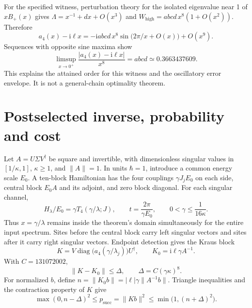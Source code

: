 \documentclass[11pt,a4paper]{article}
\newcommand{\ii}{\mathrm{i}}
\newcommand{\norm}[1]{\lVert #1\rVert}
\numberwithin{equation}{section}
\begin{document}
For the specified witness, perturbation theory for the isolated eigenvalue
near 1 of $xB_+(x)$ gives $\Lambda=x^{-1}+dx+O(x^3)$ and
$W_{\mathrm{high}}=abcd\,x^8(1+O(x^2))$. Therefore
\begin{equation}
 a_4(x)-\ii\ell x
 =-\ii abcd\,x^8\sin\bigl(2\pi/x+O(x)\bigr)+O(x^9).
 \label{eq:asymptotic}
\end{equation}
Sequences with opposite sine maxima show
\begin{equation}
 \limsup_{x\to0^+}\frac{|a_4(x)-\ii\ell x|}{x^8}
 =abcd\simeq0.3663437609.
\end{equation}
This explains the attained order for this witness and the oscillatory
error envelope. It is not a general-chain optimality theorem.

\section{Postselected inverse, probability and cost}
Let $A=U\Sigma V^\dagger$ be square and invertible, with dimensionless
singular values in $[1/\kappa,1]$, $\kappa\ge1$, and $\norm{A}=1$.
In units $\hbar=1$, introduce a common energy scale $E_0$. A ten-block
Hamiltonian has the four couplings $\gamma J_j E_0$ on each side,
central block $E_0A$ and its adjoint, and zero block diagonal.
For each singular channel,
\begin{equation}
 H_\lambda/E_0=\gamma T_4(\gamma/\lambda;J),\qquad
 t=\frac{2\pi}{\gamma E_0},\qquad
 0<\gamma\le\frac{1}{16\kappa}.
 \label{eq:units}
\end{equation}
Thus $x=\gamma/\lambda$ remains inside the theorem's domain
simultaneously for the entire input spectrum. Sites before the central
block carry left singular vectors and sites after it carry right singular
vectors. Endpoint detection gives the Kraus block
\begin{equation}
 K=V\operatorname{diag}\bigl(a_4(\gamma/\lambda_j)\bigr)U^\dagger,
 \qquad K_0=\ii\ell\gamma A^{-1}.
\end{equation}
With $C=131072002$,
\begin{equation}
 \norm{K-K_0}\le\Delta,\qquad
 \Delta=C(\gamma\kappa)^8.
 \label{eq:krauserror}
\end{equation}
For normalized $b$, define $n=\norm{K_0b}=|\ell|\gamma\norm{A^{-1}b}$.
Triangle inequalities and the contraction property of $K$ give
\begin{equation}
 \max(0,n-\Delta)^2\le p_{\mathrm{succ}}=\norm{Kb}^2
 \le\min\bigl(1,(n+\Delta)^2\bigr).
 \label{eq:success}
\end{equation}
\end{document}
